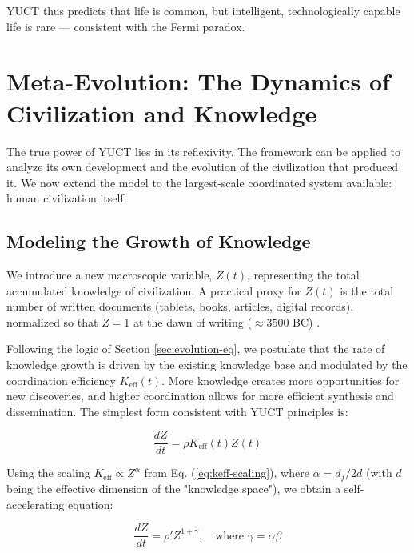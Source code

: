 \documentclass[12pt,a4paper]{article}
\theoremstyle{remark}
\newcommand{\df}{d_{\!f}}
\begin{document}
	YUCT thus predicts that life is common, but intelligent, technologically capable life is rare — consistent with the Fermi paradox.
	
	\section{Meta-Evolution: The Dynamics of Civilization and Knowledge}
	\label{sec:meta-evolution}
	
	The true power of YUCT lies in its reflexivity. The framework can be applied to analyze its own development and the evolution of the civilization that produced it. We now extend the model to the largest-scale coordinated system available: human civilization itself.
	
	\subsection{Modeling the Growth of Knowledge}
	
	We introduce a new macroscopic variable, $Z(t)$, representing the total accumulated knowledge of civilization. A practical proxy for $Z(t)$ is the total number of written documents (tablets, books, articles, digital records), normalized so that $Z=1$ at the dawn of writing ($\approx 3500$ BC) \cite{Buringh2009, Desai2026}.
	
	Following the logic of Section \ref{sec:evolution-eq}, we postulate that the rate of knowledge growth is driven by the existing knowledge base and modulated by the coordination efficiency $K_{\text{eff}}(t)$. More knowledge creates more opportunities for new discoveries, and higher coordination allows for more efficient synthesis and dissemination. The simplest form consistent with YUCT principles is:
	
	\begin{equation}
		\frac{dZ}{dt} = \rho K_{\text{eff}}(t) Z(t)
		\label{eq:Z-growth}
	\end{equation}
	
	Using the scaling $K_{\text{eff}} \propto Z^{\alpha}$ from Eq. (\ref{eq:keff-scaling}), where $\alpha = \df/2d$ (with $d$ being the effective dimension of the "knowledge space"), we obtain a self-accelerating equation:
	
	\begin{equation}
		\frac{dZ}{dt} = \rho' Z^{1+\gamma}, \quad \text{where } \gamma = \alpha \beta
		\label{eq:Z-self-accel}
	\end{equation}
	
\end{document}
